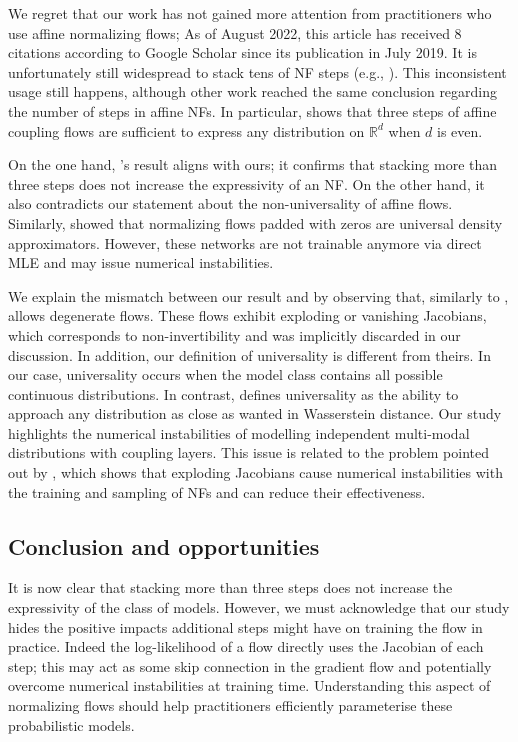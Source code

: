 We regret that our work has not gained more attention from practitioners who use affine normalizing flows; As of August 2022, this article has received $8$ citations according to Google Scholar since its publication in July 2019. It is unfortunately still widespread to stack tens of NF steps (e.g., \citep{daxamortized}). This inconsistent usage still happens, although other work reached the same conclusion regarding the number of steps in affine NFs. In particular, \citet{koehler2021representational} shows that three steps of affine coupling flows are sufficient to express any distribution on $\mathbb{R}^d$ when $d$ is even.

On the one hand, \citet{koehler2021representational}'s result aligns with ours; it confirms that stacking more than three steps does not increase the expressivity of an NF.
On the other hand, it also contradicts our statement about the non-universality of affine flows. Similarly, \citet{huang2020augmented} showed that normalizing flows padded with zeros are universal density approximators. However, these networks are not trainable anymore via direct MLE and may issue numerical instabilities.

We explain the mismatch between our result and \citet{koehler2021representational} by observing that, similarly to \citet{huang2020augmented}, \citet{koehler2021representational} allows degenerate flows. These flows exhibit exploding or vanishing Jacobians, which corresponds to non-invertibility and was implicitly discarded in our discussion. In addition, our definition of universality is different from theirs. In our case, universality occurs when the model class contains all possible continuous distributions. In contrast, \citet{koehler2021representational} defines universality as the ability to approach any distribution as close as wanted in Wasserstein distance. Our study highlights the numerical instabilities of modelling independent multi-modal distributions with coupling layers. This issue is related to the problem pointed out by \citet{behrmann2021understanding}, which shows that exploding Jacobians cause numerical instabilities with the training and sampling of NFs and can reduce their effectiveness.

\subsection{Conclusion and opportunities}
It is now clear that stacking more than three steps does not increase the expressivity of the class of models. However, we must acknowledge that our study hides the positive impacts additional steps might have on training the flow in practice. Indeed the log-likelihood of a flow directly uses the Jacobian of each step; this may act as some skip connection in the gradient flow and potentially overcome numerical instabilities at training time. Understanding this aspect of normalizing flows should help practitioners efficiently parameterise these probabilistic models.

